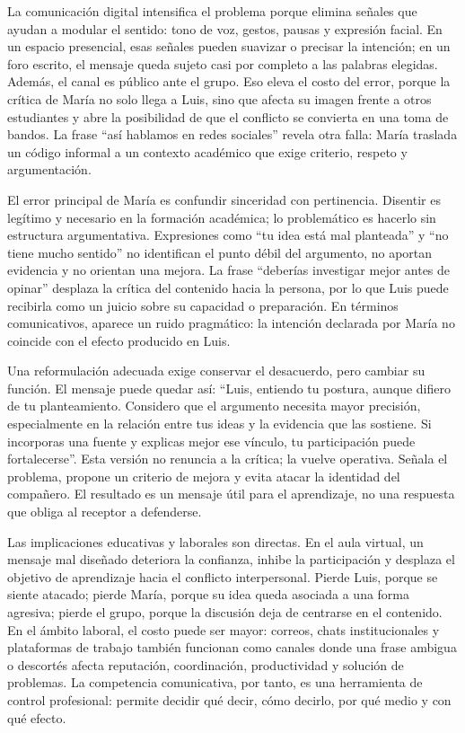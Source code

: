 La comunicación digital intensifica el problema porque elimina señales que ayudan a modular el sentido: tono de voz, gestos, pausas y expresión facial. En un espacio presencial, esas señales pueden suavizar o precisar la intención; en un foro escrito, el mensaje queda sujeto casi por completo a las palabras elegidas. Además, el canal es público ante el grupo. Eso eleva el costo del error, porque la crítica de María no solo llega a Luis, sino que afecta su imagen frente a otros estudiantes y abre la posibilidad de que el conflicto se convierta en una toma de bandos. La frase ``así hablamos en redes sociales'' revela otra falla: María traslada un código informal a un contexto académico que exige criterio, respeto y argumentación.

El error principal de María es confundir sinceridad con pertinencia. Disentir es legítimo y necesario en la formación académica; lo problemático es hacerlo sin estructura argumentativa. Expresiones como ``tu idea está mal planteada'' y ``no tiene mucho sentido'' no identifican el punto débil del argumento, no aportan evidencia y no orientan una mejora. La frase ``deberías investigar mejor antes de opinar'' desplaza la crítica del contenido hacia la persona, por lo que Luis puede recibirla como un juicio sobre su capacidad o preparación. En términos comunicativos, aparece un ruido pragmático: la intención declarada por María no coincide con el efecto producido en Luis.

Una reformulación adecuada exige conservar el desacuerdo, pero cambiar su función. El mensaje puede quedar así: ``Luis, entiendo tu postura, aunque difiero de tu planteamiento. Considero que el argumento necesita mayor precisión, especialmente en la relación entre tus ideas y la evidencia que las sostiene. Si incorporas una fuente y explicas mejor ese vínculo, tu participación puede fortalecerse''. Esta versión no renuncia a la crítica; la vuelve operativa. Señala el problema, propone un criterio de mejora y evita atacar la identidad del compañero. El resultado es un mensaje útil para el aprendizaje, no una respuesta que obliga al receptor a defenderse.

Las implicaciones educativas y laborales son directas. En el aula virtual, un mensaje mal diseñado deteriora la confianza, inhibe la participación y desplaza el objetivo de aprendizaje hacia el conflicto interpersonal. Pierde Luis, porque se siente atacado; pierde María, porque su idea queda asociada a una forma agresiva; pierde el grupo, porque la discusión deja de centrarse en el contenido. En el ámbito laboral, el costo puede ser mayor: correos, chats institucionales y plataformas de trabajo también funcionan como canales donde una frase ambigua o descortés afecta reputación, coordinación, productividad y solución de problemas. La competencia comunicativa, por tanto, es una herramienta de control profesional: permite decidir qué decir, cómo decirlo, por qué medio y con qué efecto.

